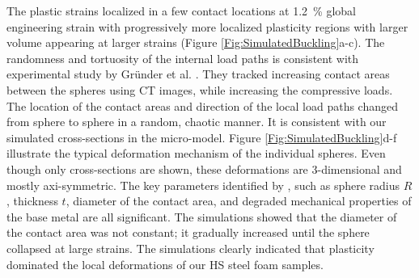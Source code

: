 \documentclass[review]{elsarticle}
\begin{document}
The plastic strains localized in a few contact locations at 1.2~\% global engineering strain with progressively more localized plasticity regions with larger volume appearing at larger strains (Figure \ref{Fig:SimulatedBuckling}a-c). The randomness and tortuosity of the internal load paths is consistent with experimental study by Gr\"{u}nder et al. \cite{grunder_modeling_2001}. They tracked increasing contact areas between the spheres using CT images, while increasing the compressive loads. The location of the contact areas and direction of the local load paths changed from sphere to sphere in a random, chaotic manner. It is consistent with our simulated cross-sections in the micro-model. Figure \ref{Fig:SimulatedBuckling}d-f illustrate the typical deformation mechanism of the individual spheres. Even though only cross-sections are shown, these deformations are 3-dimensional and mostly axi-symmetric. The key parameters identified by \cite{Fallet2008}, such as sphere radius $R$, thickness $t$, diameter of the contact area, and degraded mechanical properties of the base metal are all significant. The simulations showed that the diameter of the contact area was not constant; it gradually increased until the sphere collapsed at large strains. The simulations clearly indicated that plasticity dominated the local deformations of our HS steel foam samples.
\end{document}
